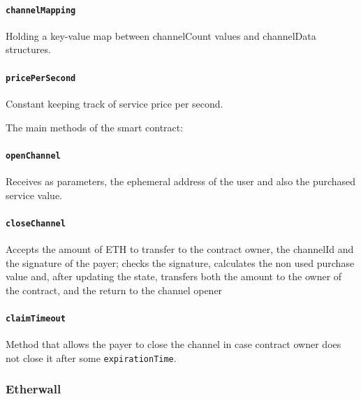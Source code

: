 \documentclass[12pt]{amsart}
\begin{document}
\begin{multicols}{2}
\vspace{0.35cm}

\paragraph{\texttt{channelMapping}} Holding a key-value map between
channelCount values and channelData structures.

\vspace{0.35cm}

\paragraph{\texttt{pricePerSecond}} Constant keeping track of
service price per second.

\vspace{0.35cm}

The main methods of the smart contract:

\vspace{0.35cm}

\paragraph{\texttt{openChannel}} Receives as parameters, the ephemeral address
of the user and also the purchased service value.

\vspace{0.35cm}

\paragraph{\texttt{closeChannel}} Accepts the amount of ETH to
transfer to the contract owner, the channelId and the signature of the
payer; checks the signature, calculates the non used purchase value
and, after updating the state, transfers both the amount to the owner
of the contract, and the return to the channel opener

\vspace{0.35cm}


\paragraph{\texttt{claimTimeout}} Method that allows the payer to
close the channel in case contract owner does not close it after
some \texttt{expirationTime}.

\subsubsection{Etherwall}


\end{multicols}
\end{document}
